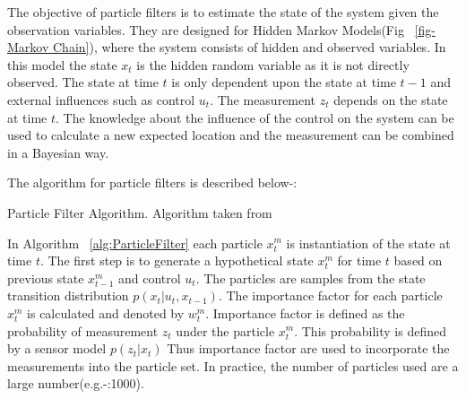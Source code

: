 \documentclass[12pt]{dalcsthesis}
\begin{document}
The objective of particle filters is to estimate the state of the system given the observation variables. They are designed for Hidden Markov Models(Fig ~\ref{fig-Markov Chain}), where the system consists of hidden and observed variables. In this model the state $x_{t}$ is the hidden random variable as it is not directly observed. The state at time $t$ is only dependent upon the state at time $t-1$ and external influences such as control $u_{t}$. The measurement $z_{t}$ depends on the state at time $t$. The knowledge about the influence of the control on the system can be used to calculate a new expected location and the measurement can be combined in a Bayesian way.

The algorithm for particle filters is described below-:

\begin{algorithm}[H]
\label{alg:ParticleFilter}
 \SetAlgoLined
  		 


\caption{Particle Filter Algorithm. Algorithm taken from \cite{thrun2005probabilistic}}
\end{algorithm}

In Algorithm ~\ref{alg:ParticleFilter} each particle $x_{t}^{m}$ is instantiation of the state at time $t$.  The first step is to generate a hypothetical state $x_{t}^{m}$ for time $t$ based on previous state $x_{t-1}^{m}$ and control $u_{t}$. The particles are samples from the state transition distribution $p(x_{t}|u_{t},x_{t-1})$. The importance factor for each particle $x_{t}^{m}$ is calculated and denoted by $w_{t}^{m}$. Importance factor is defined as the probability of measurement $z_{t}$ under the particle $x_{t}^{m}$. This probability is defined by a sensor model $p(z_{t}|x_{t})$ Thus importance factor are used to incorporate the measurements into the particle set. In practice, the number of particles used are a large number(e.g.-:1000).
\end{document}
